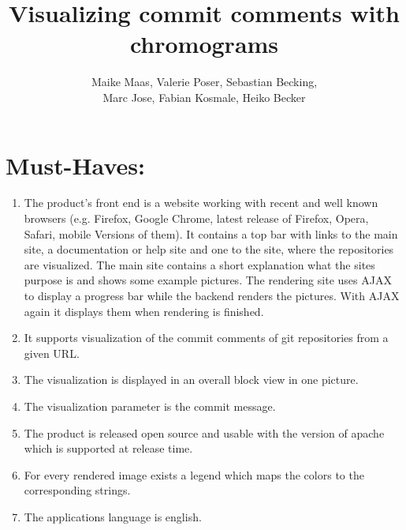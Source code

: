 \documentclass[12pt]{scrartcl}
\author{Maike Maas, Valerie Poser, Sebastian Becking,\\
Marc Jose, Fabian Kosmale, Heiko Becker}
\title{Visualizing commit comments with chromograms}
\begin{document}
\maketitle
\section{Must-Haves:}
\begin{enumerate}
\item The product's front end is a website working with recent and well known browsers (e.g. Firefox, Google Chrome, latest release of Firefox, Opera, Safari, mobile Versions of them). It contains a top bar with links to the main site, a documentation or help site and one to the site, where the repositories are visualized. The main site contains a short explanation what the sites purpose is and shows some example pictures. The rendering site uses AJAX to display a progress bar while the backend renders the pictures. With AJAX again it displays them when rendering is finished.
\item It supports visualization of the commit comments of git repositories from a given URL. 
\item The visualization is displayed in an overall block view in one picture.
\item The visualization parameter is the commit message.
\item The product is released open source and usable with the version of apache which is supported at release time.
\item For every rendered image exists a legend which maps the colors to the corresponding strings.
\item The applications language is english.
\end{enumerate}
\end{document}
